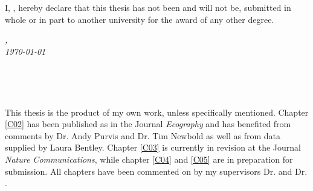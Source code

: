 %

\vspace*{5cm}

\begin{flushleft}
	\large{\noindent I, \myName, hereby declare that this thesis has not been and will not be, submitted in whole or in part to another university for the award of any other degree.}
\end{flushleft}

\vspace*{2cm}

\begin{minipage}{.45\linewidth}
	\begin{flushleft} %
		\textit{\myLocation,} \\
		\textit{\today}%
	\end{flushleft}
\end{minipage}
\hfill
\begin{minipage}{.45\linewidth}
	\begin{flushright} %
		\makebox[2.5in]{\hrulefill} \\
		\myName 
	\end{flushright}
\end{minipage}\\ [0.5cm]



\vspace*{5cm}

\begin{flushleft}
	\noindent This thesis is the product of my own work, unless specifically mentioned. 
	Chapter \ref{C02} has been published as \cite{Jung2018} in the Journal \textit{Ecography} and has benefited from comments by Dr. Andy Purvis and Dr. Tim Newbold as well as from data supplied by Laura Bentley. Chapter \ref{C03} is currently in revision at the Journal \textit{Nature Communications}, while chapter \ref{C04} and \ref{C05} are in preparation for submission. All chapters have been commented on by my supervisors Dr. \myProf and Dr. \myOtherProf.
\end{flushleft}

